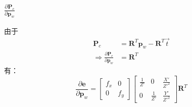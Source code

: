 \documentclass{article}
\begin{document}
\subsubsection{$\frac{\partial{\boldsymbol{P}_c}}{\partial{\boldsymbol{p}_w}}$}
由于
$$
\begin{aligned}
	\boldsymbol{P}_c                                                          & = \boldsymbol{R}^T\boldsymbol{p}_w-\boldsymbol{R}^T\vec{t} \\
	\Rightarrow \frac{\partial{\boldsymbol{P}_c}}{\partial{\boldsymbol{p}_w}} & = \boldsymbol{R}^T                                         
\end{aligned}
$$
有：
\begin{equation}
	\frac{\partial{\boldsymbol{e}}}{\partial{\boldsymbol{p}_w}} = 
	\left[
		\begin{matrix}
			f_x & 0   \\
			0   & f_y 
		\end{matrix}
	\right]
	\left[ 
		\begin{matrix}
			\frac{1}{Z'} & 0            & \frac{X'}{Z'^2} \\
			0            & \frac{1}{Z'} & \frac{Y'}{Z'^2} 
		\end{matrix}
	\right]
	\boldsymbol{R}^T
\end{equation}
\end{document}
